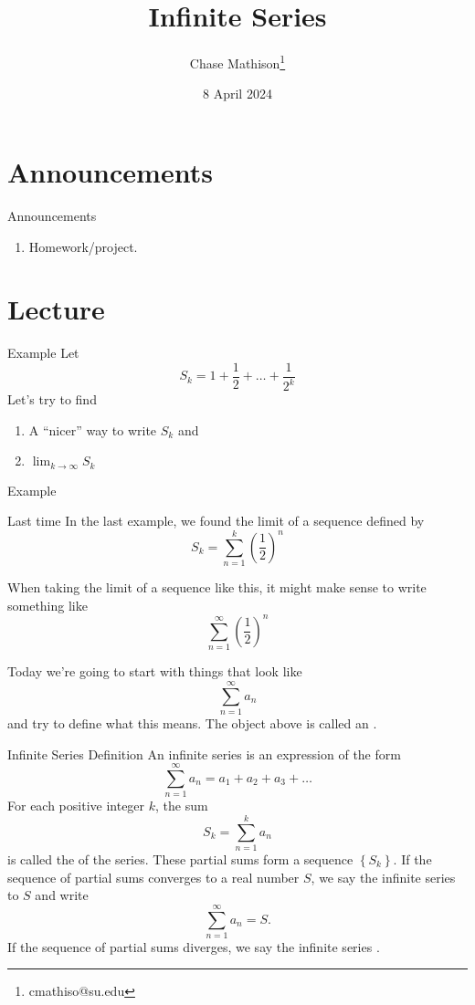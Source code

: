 \documentclass[presentation]{beamer}
\institute[SU]{Shenandoah University}
\author{Chase Mathison\thanks{cmathiso@su.edu}}
\date{8 April 2024}
\title{Infinite Series}
\begin{document}
\maketitle

\section{Announcements}
\label{sec:orgbf3ff1c}
\begin{frame}[label={sec:org74d12f0}]{Announcements}
\begin{enumerate}
\item Homework/project.
\end{enumerate}
\end{frame}

\section{Lecture}
\label{sec:org9303e8d}
\begin{frame}[label={sec:org77232fa}]{Example}
Let
\[
S_k = 1 + \frac{1}{2} + \ldots + \frac{1}{2^k}\]
Let's try to find
\begin{enumerate}
\item A ``nicer'' way to write \(S_k\) and
\item \(\lim_{k\rightarrow \infty} S_k\)
\end{enumerate}
\vspace{10in}
\end{frame}

\begin{frame}[label={sec:orgdcee242}]{Example}
\end{frame}

\begin{frame}[label={sec:org4663060}]{Last time}
In the last example, we found the limit
of a sequence defined by
\[
S_k = \sum\limits_{n=1}^k \left( \frac{1}{2} \right)^n\]

When taking the limit of a sequence like this, it might make sense to write something
like
\[
\sum\limits_{n=1}^{\infty} \left( \frac{1}{2} \right)^n\]

Today we're going to start with things that look like
\[
\sum\limits_{n=1}^{\infty} a_n\]
and try to define what this means.  The object above is called an \uline{\hspace*{1in}}.
\end{frame}

\begin{frame}[label={sec:org1e359d1}]{Infinite Series Definition}
An infinite series is an expression of the form
\[
\sum\limits_{n=1}^{\infty} a_n = a_1 + a_2 + a_3 + \ldots \]
For each positive integer \(k\), the sum
\[
S_k = \sum\limits_{n=1}^k a_n\]
is called the \uline{\hspace*{2in}} of the series.  These partial sums form a
sequence \(\left\{ S_k \right\}\).  If the sequence of partial sums converges
to a real number \(S\), we say the infinite series \uline{\hspace*{1in}} to \(S\) and write
\[
\sum\limits_{n=1}^{\infty} a_n = S.\]
If the sequence of partial sums diverges, we say the infinite series \uline{\hspace*{1in}}.
\end{frame}
\end{document}

